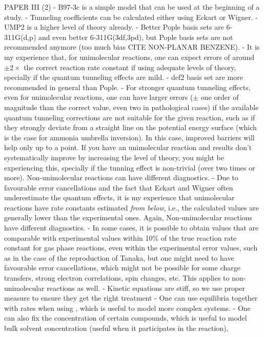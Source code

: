 PAPER III (2)
- B97-3c is a simple model that can be used at the beginning of a study.
- Tunneling coefficients can be calculated either using Eckart or Wigner.
- UMP2 is a higher level of theory already.
- Better Pople basis sets are 6-311G(d,p) and even better 6-311G(3df,3pd),
but Pople basis sets are not recommended anymore (too much bias CITE NON-PLANAR BENZENE).
- It is my experience that,
for unimolecular reactions,
one can expect errors of around
$\pm 2 \times$ the correct reaction rate constant if using adequate levels of theory,
specially if
the quantum tunneling effects are mild.
- def2 basis set are more recommended in general than Pople.
- For stronger quantum tunneling effects,
even for unimolecular reactions,
one can have larger errors
($\pm$ one order of magnitude than the correct value,
even two in pathological cases) if the available quantum tunneling corrections are not suitable
for the given reaction,
such as if they strongly deviate from a straight line on the potential energy surface
(which is the case for ammonia umbrella inversion).
In this case,
improved barriers will help only up to a point.
If you have an unimolecular reaction
and results don't systematically improve by increasing the level of theory,
you might be experiencing this,
specially if the tunning effect is non-trivial (over two times or more).
Non-unimolecular reactions can have different diagnostics.
- Due to favourable error cancellations and the fact that
Eckart and Wigner often underestimate the quantum effects,
it is my experience that unimolecular reactions
have rate constants estimated \emph{from below},
i.e.,
the calculated values are generally lower than the
experimental ones.
Again,
Non-unimolecular reactions have different diagnostics.
- In some cases,
it is possible to obtain
values that are comparable with experimental values within 10\% of
the true reaction rate constant for gas phase reactions,
even within the experimental error values,
such as in the case
of the reproduction of Tanaka,
but one might need to have favourable error cancellations,
which might not be possible for some charge transfers,
strong electron correlations,
spin changes,
etc.
This applies to non-unimolecular reactions as well.
- Kinetic equations are stiff,
so we use proper measure to ensure they get the right treatment
- One can use equilibria together with rates when using \overreact{},
which is useful to model more complex systems.
- One can also fix the concentration of certain compounds,
which is useful
to model bulk solvent concentration (useful when it participates in the reaction),
